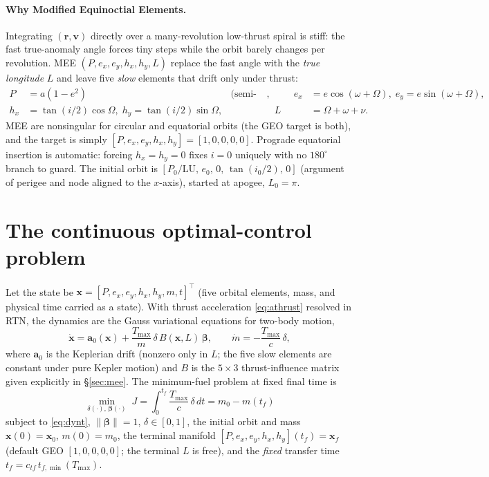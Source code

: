 \documentclass[11pt]{article}
\newcommand{\rv}{\mathbf{r}}
\newcommand{\vv}{\mathbf{v}}
\newcommand{\bv}{\boldsymbol{\beta}}
\newcommand{\xv}{\mathbf{x}}
\newcommand{\Tmax}{T_{\max}}
\begin{document}
\paragraph{Why Modified Equinoctial Elements.} Integrating $(\rv,\vv)$ directly
over a many-revolution low-thrust spiral is stiff: the fast true-anomaly angle
forces tiny steps while the orbit barely changes per revolution. MEE
$(P,e_x,e_y,h_x,h_y,L)$ replace the fast angle with the \emph{true longitude} $L$
and leave five \emph{slow} elements that drift only under thrust:
\begin{equation}
\begin{aligned}
P&=a(1-e^2) &\text{(semi-latus rectum)},&\qquad
e_x&=e\cos(\omega+\Omega),\; e_y=e\sin(\omega+\Omega),\\
h_x&=\tan(i/2)\cos\Omega,\; h_y=\tan(i/2)\sin\Omega,&&
L&=\Omega+\omega+\nu.
\end{aligned}
\end{equation}
MEE are nonsingular for circular and equatorial orbits (the GEO target is both),
and the target is simply $[P,e_x,e_y,h_x,h_y]=[1,0,0,0,0]$. Prograde equatorial
insertion is automatic: forcing $h_x=h_y=0$ fixes $i=0$ uniquely with no
$180^\circ$ branch to guard. The initial orbit is
$[P_0/\mathrm{LU},\,e_0,\,0,\,\tan(i_0/2),\,0]$ (argument of perigee and node
aligned to the $x$-axis), started at apogee, $L_0=\pi$.

\section{The continuous optimal-control problem}

Let the state be $\xv=[P,e_x,e_y,h_x,h_y,m,t]^\top$ (five orbital elements, mass,
and physical time carried as a state). With thrust acceleration
\eqref{eq:athrust} resolved in RTN, the dynamics are the Gauss variational
equations for two-body motion,
\begin{equation}
\dot{\xv} = \mathbf{a}_0(\xv) + \frac{\Tmax}{m}\,\delta\,B(\xv,L)\,\bv,
\qquad \dot m = -\frac{\Tmax}{c}\,\delta,
\label{eq:dynt}
\end{equation}
where $\mathbf{a}_0$ is the Keplerian drift (nonzero only in $L$; the five slow
elements are constant under pure Kepler motion) and $B$ is the $5\times3$
thrust-influence matrix given explicitly in \S\ref{sec:mee}. The minimum-fuel
problem at fixed final time is
\begin{equation}
\min_{\delta(\cdot),\,\bv(\cdot)}\; J=\int_0^{t_f}\frac{\Tmax}{c}\,\delta\,dt
= m_0-m(t_f)
\label{eq:ocp}
\end{equation}
subject to \eqref{eq:dynt}, $\lVert\bv\rVert=1$, $\delta\in[0,1]$, the initial
orbit and mass $\xv(0)=\xv_0$, $m(0)=m_0$, the terminal manifold
$[P,e_x,e_y,h_x,h_y](t_f)=\xv_f$ (default GEO $[1,0,0,0,0]$; the terminal $L$ is
free), and the \emph{fixed} transfer time $t_f=c_{tf}\,t_{f,\min}(\Tmax)$.
\end{document}
